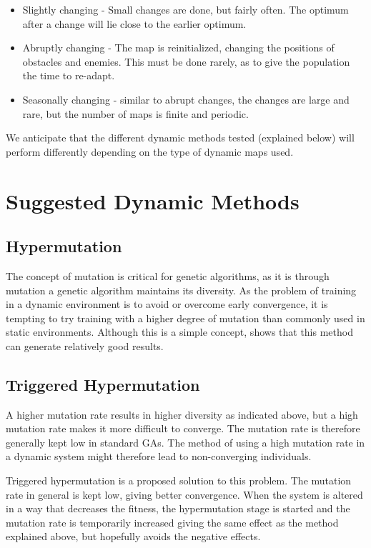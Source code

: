 \documentclass[a4paper,12pt]{article}
\begin{document}
\begin{itemize}

\item
Slightly changing - Small changes are done, but fairly often. The optimum after a change will lie close to the earlier optimum.
\item
Abruptly changing - The map is reinitialized, changing the positions of obstacles and enemies. This must be done rarely, as to give the population the time to re-adapt.
\item
Seasonally changing - similar to abrupt changes, the changes are large and rare, but the number of maps is finite and periodic.
\end{itemize}

We anticipate that the different dynamic methods tested (explained below) will perform differently depending on the type of dynamic maps used.

\section{Suggested Dynamic Methods}
\subsection{Hypermutation}
The concept of mutation is critical for genetic algorithms, as it is through mutation a genetic algorithm maintains its diversity. As the problem of training in a dynamic environment is to avoid or overcome early convergence, it is tempting to try training with a higher degree of mutation than commonly used in static environments. Although this is a simple concept, \cite{cobb} shows that this method can generate relatively good results.

\subsection{Triggered Hypermutation}
A higher mutation rate results in higher diversity as indicated above, but a high mutation rate makes it more difficult to converge. The mutation rate is therefore generally kept low in standard GAs. The method of using a high mutation rate in a dynamic system might therefore lead to non-converging individuals.

Triggered hypermutation is a proposed solution to this problem. The mutation rate in general is kept low, giving better convergence. When the system is altered in a way that decreases the fitness, the hypermutation stage is started and the mutation rate is temporarily increased giving the same effect as the method explained above, but hopefully avoids the negative effects.
\end{document}
